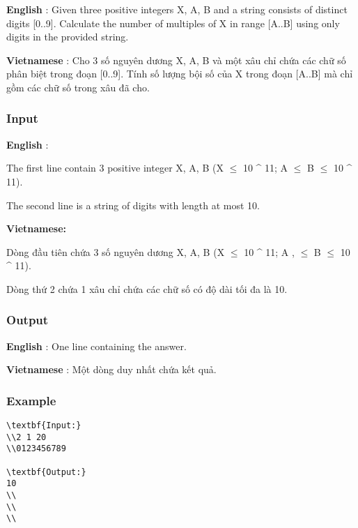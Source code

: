 



\textbf{    English   }   : Given three positive integers X, A, B and a string consists of distinct digits [0..9]. Calculate the number of multiples of X in range [A..B] using only digits in the provided string.  

\textbf{    Vietnamese   }   : Cho 3 số nguyên dương X, A, B và một xâu chỉ chứa các chữ số phân biệt trong đoạn [0..9]. Tính số lượng bội số của X trong đoạn [A..B] mà chỉ gồm các chữ số trong xâu đã cho.  

\subsubsection{   Input  }

\textbf{    English   }   :  

   The first line contain 3 positive integer X, A, B (X  $\le$  10 ^ 11; A  $\le$  B  $\le$  10 ^ 11).  

   The second line is a string of digits with length at most 10.  

\textbf{    Vietnamese:   }

   Dòng đầu tiên chứa 3 số nguyên dương X, A, B (X  $\le$  10 ^ 11; A , $\le$  B  $\le$  10 ^ 11).  

   Dòng thứ 2 chứa 1 xâu chỉ chứa các chữ số có độ dài tối đa là 10.  

\subsubsection{   Output  }

\textbf{    English   }   : One line containing the answer.  

\textbf{    Vietnamese   }   : Một dòng duy nhất chứa kết quả.  

\subsubsection{   Example  }
\begin{verbatim}
\textbf{Input:}
\\2 1 20
\\0123456789

\textbf{Output:}
10
\\
\\
\\\end{verbatim}
